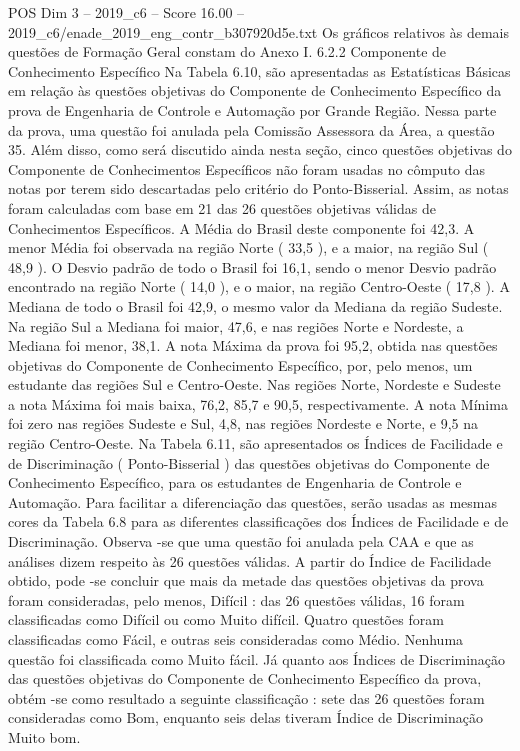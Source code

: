\begin{textsample}{POS Dim 3 – 2019\_c6 – Score 16.00 – 2019\_c6/enade\_2019\_eng\_contr\_b307920d5e.txt}
Os gráficos relativos às demais questões de Formação Geral constam do Anexo I. 6.2.2 Componente de Conhecimento Específico Na Tabela 6.10, são apresentadas as Estatísticas Básicas em relação às questões objetivas do Componente de Conhecimento Específico da prova de Engenharia de Controle e Automação por Grande Região.
Nessa parte da prova, uma questão foi anulada pela Comissão Assessora da Área, a questão 35.
Além disso, como será discutido ainda nesta seção, cinco questões objetivas do Componente de Conhecimentos Específicos não foram usadas no cômputo das notas por terem sido descartadas pelo critério do Ponto-Bisserial.
Assim, as notas foram calculadas com base em 21 das 26 questões objetivas válidas de Conhecimentos Específicos.
A Média do Brasil deste componente foi 42,3.
A menor Média foi observada na região Norte ( 33,5 ), e a maior, na região Sul ( 48,9 ).
O Desvio padrão de todo o Brasil foi 16,1, sendo o menor Desvio padrão encontrado na região Norte ( 14,0 ), e o maior, na região Centro-Oeste ( 17,8 ).
A Mediana de todo o Brasil foi 42,9, o mesmo valor da Mediana da região Sudeste.
Na região Sul a Mediana foi maior, 47,6, e nas regiões Norte e Nordeste, a Mediana foi menor, 38,1.
A nota Máxima da prova foi 95,2, obtida nas questões objetivas do Componente de Conhecimento Específico, por, pelo menos, um estudante das regiões Sul e Centro-Oeste.
Nas regiões Norte, Nordeste e Sudeste a nota Máxima foi mais baixa, 76,2, 85,7 e 90,5, respectivamente.
A nota Mínima foi zero nas regiões Sudeste e Sul, 4,8, nas regiões Nordeste e Norte, e 9,5 na região Centro-Oeste.
Na Tabela 6.11, são apresentados os Índices de Facilidade e de Discriminação ( Ponto-Bisserial ) das questões objetivas do Componente de Conhecimento Específico, para os estudantes de Engenharia de Controle e Automação.
Para facilitar a diferenciação das questões, serão usadas as mesmas cores da Tabela 6.8 para as diferentes classificações dos Índices de Facilidade e de Discriminação.
Observa -se que uma questão foi anulada pela CAA e que as análises dizem respeito às 26 questões válidas.
A partir do Índice de Facilidade obtido, pode -se concluir que mais da metade das questões objetivas da prova foram consideradas, pelo menos, Difícil : das 26 questões válidas, 16 foram classificadas como Difícil ou como Muito difícil.
Quatro questões foram classificadas como Fácil, e outras seis consideradas como Médio.
Nenhuma questão foi classificada como Muito fácil.
Já quanto aos Índices de Discriminação das questões objetivas do Componente de Conhecimento Específico da prova, obtém -se como resultado a seguinte classificação : sete das 26 questões foram consideradas como Bom, enquanto seis delas tiveram Índice de Discriminação Muito bom.

\end{textsample}

